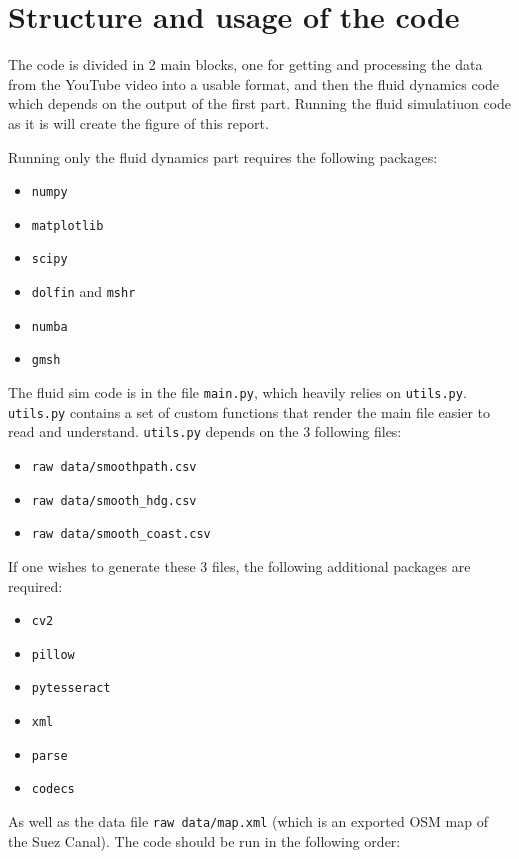 \documentclass[a4paper]{article}
\begin{document}
\newpage
\appendix
\section{Structure and usage of the code}
The code is divided in 2 main blocks, one for getting and processing the data from the YouTube video\cite{goodvideo} into a usable format, and then the fluid dynamics code which depends on the output of the first part. Running the fluid simulatiuon code as it is will create the figure of this report.

Running only the fluid dynamics part requires the following packages:
\begin{itemize}
	\item \texttt{numpy}
	\item \texttt{matplotlib}
	\item \texttt{scipy}
	\item \texttt{dolfin} and \texttt{mshr}
	\item \texttt{numba}
	\item \texttt{gmsh}
\end{itemize}
The fluid sim code is in the file \texttt{main.py}, which heavily relies on \texttt{utils.py}. \texttt{utils.py} contains a set of custom functions that render the main file easier to read and understand. \texttt{utils.py} depends on the 3 following files:
\begin{itemize}
	\item \texttt{raw data/smoothpath.csv}
	\item \texttt{raw data/smooth\_hdg.csv}
	\item \texttt{raw data/smooth\_coast.csv}
\end{itemize} 
If one wishes to generate these 3 files, the following additional packages are required:
\begin{itemize}
	\item \texttt{cv2}
	\item \texttt{pillow}
	\item \texttt{pytesseract}
	\item \texttt{xml}
	\item \texttt{parse}
	\item \texttt{codecs}
\end{itemize}
As well as the data file \texttt{raw data/map.xml} (which is an exported OSM map of the Suez Canal). The code should be run in the following order:
\end{document}
